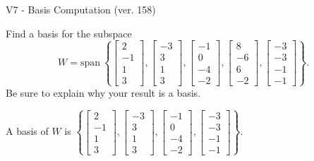 \begin{exercise}
  \begin{exerciseTitle}V7 - Basis Computation (ver. 158)\end{exerciseTitle}
  \begin{exerciseStatement}
    Find a basis for the subspace 
\[W=\mathrm{span}\ \left\{\left[\begin{array}{r}
2 \\
-1 \\
1 \\
3
\end{array}\right] , \left[\begin{array}{r}
-3 \\
3 \\
1 \\
3
\end{array}\right] , \left[\begin{array}{r}
-1 \\
0 \\
-4 \\
-2
\end{array}\right] , \left[\begin{array}{r}
8 \\
-6 \\
6 \\
-2
\end{array}\right] , \left[\begin{array}{r}
-3 \\
-3 \\
-1 \\
-1
\end{array}\right]\right\}.\]
 Be sure to explain why your result is a basis.


  \end{exerciseStatement}
  \begin{exerciseAnswer}
   A basis of \(W\) is  \(\left\{\left[\begin{array}{r}
2 \\
-1 \\
1 \\
3
\end{array}\right] , \left[\begin{array}{r}
-3 \\
3 \\
1 \\
3
\end{array}\right] , \left[\begin{array}{r}
-1 \\
0 \\
-4 \\
-2
\end{array}\right] , \left[\begin{array}{r}
-3 \\
-3 \\
-1 \\
-1
\end{array}\right]\right\}\).
  


  \end{exerciseAnswer}
\end{exercise}
